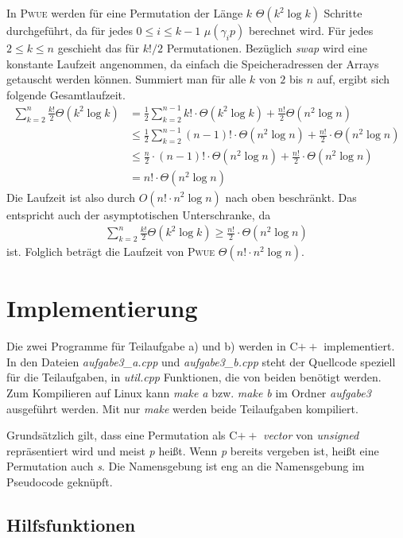 \documentclass[a4paper, 10pt, ngerman]{article}
\begin{document}
In \textsc{Pwue} werden für eine Permutation der Länge $k$ $\Theta(k^2 \log k)$ Schritte durchgeführt, da für jedes $0 \le i \le k - 1$ $\mu(\gamma_i p)$ berechnet wird. Für jedes $2 \le k \le n$ geschieht das für $k! / 2$ Permutationen. Bezüglich \emph{swap} wird eine konstante Laufzeit angenommen, da einfach die Speicheradressen der Arrays getauscht werden können. Summiert man für alle $k$ von $2$ bis $n$ auf, ergibt sich folgende Gesamtlaufzeit.
\begin{align*}
    \sum_{k = 2}^{n} \frac {k!} 2 \Theta(k^2 \log k)
     & = \frac 1 2 \sum_{k = 2}^{n - 1} k! \cdot \Theta(k^2 \log k) + \frac {n!} 2 \Theta(n^2 \log n) \\
     & \le \frac 1 2 \sum_{k = 2}^{n - 1} (n - 1)! \cdot \Theta(n^2 \log n) + \frac {n!} 2 \cdot \Theta(n^2 \log n) \\
     & \le \frac n 2 \cdot (n - 1)! \cdot \Theta(n^2 \log n) + \frac{n!} 2 \cdot \Theta(n^2 \log n)                 \\
     & = n! \cdot \Theta(n^2 \log n)
\end{align*}
Die Laufzeit ist also durch $O(n! \cdot n^2 \log n)$ nach oben beschränkt. Das entspricht auch der asymptotischen Unterschranke, da
\begin{align*}
    \sum_{k = 2}^{n} \frac {k!} 2 \Theta(k^2 \log k)
    \ge \frac {n!} 2 \cdot \Theta(n^2 \log n)
\end{align*}
ist. Folglich beträgt die Laufzeit von \textsc{Pwue} $\Theta(n! \cdot n^2 \log n)$.

\section{Implementierung}

Die zwei Programme für Teilaufgabe a) und b) werden in C$++$ implementiert. In den Dateien \emph{aufgabe3\_a.cpp} und \emph{aufgabe3\_b.cpp} steht der Quellcode speziell für die Teilaufgaben, in \emph{util.cpp} Funktionen, die von beiden benötigt werden. Zum Kompilieren auf Linux kann \emph{make a} bzw. \emph{make b} im Ordner \emph{aufgabe3} ausgeführt werden. Mit nur \emph{make} werden beide Teilaufgaben kompiliert.

Grundsätzlich gilt, dass eine Permutation als C$++$ \emph{vector} von \emph{unsigned} repräsentiert wird und meist \emph{p} heißt. Wenn \emph{p} bereits vergeben ist, heißt eine Permutation auch \emph{s}. Die Namensgebung ist eng an die Namensgebung im Pseudocode geknüpft.

\subsection{Hilfsfunktionen}
\end{document}
